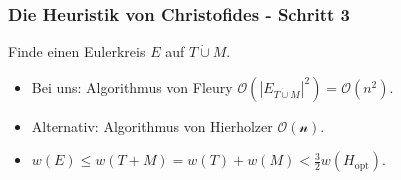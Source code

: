 \begin{frame}
    \frametitle{Die Heuristik von Christofides - Schritt 3}
    Finde einen Eulerkreis $E$ auf $T \dot{\cup} M$.
    \begin{itemize}
        \item Bei uns: Algorithmus von Fleury $\mathcal{O}(|E_{T \dot{\cup} M}|^2) = \mathcal{O}(n^2)$.
        \item Alternativ: Algorithmus von Hierholzer $\mathcal{O(n)}$.
        \item $w(E) \leq w(T + M) = w(T) + w(M) < \frac{3}{2}w(H_{\mathrm{opt}})$.
    \end{itemize}
\end{frame}